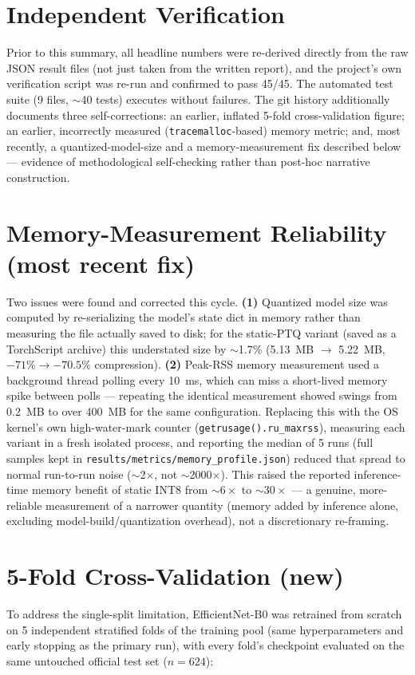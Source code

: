 \documentclass[11pt]{article}
\begin{document}
\section*{Independent Verification}
Prior to this summary, all headline numbers were re-derived directly from
the raw JSON result files (not just taken from the written report), and the
project's own verification script was re-run and confirmed to pass 45/45.
The automated test suite (9 files, $\sim$40 tests) executes without
failures. The git history additionally documents three self-corrections: an
earlier, inflated 5-fold cross-validation figure; an earlier, incorrectly
measured (\texttt{tracemalloc}-based) memory metric; and, most recently, a
quantized-model-size and a memory-measurement fix described below ---
evidence of methodological self-checking rather than post-hoc narrative
construction.

\section*{Memory-Measurement Reliability (most recent fix)}
Two issues were found and corrected this cycle. \textbf{(1)} Quantized model
size was computed by re-serializing the model's state dict in memory rather
than measuring the file actually saved to disk; for the static-PTQ variant
(saved as a TorchScript archive) this understated size by $\sim$1.7\%
(5.13~MB $\to$ 5.22~MB, $-71\% \to -70.5\%$ compression). \textbf{(2)}
Peak-RSS memory measurement used a background thread polling every 10~ms,
which can miss a short-lived memory spike between polls --- repeating the
identical measurement showed swings from 0.2~MB to over 400~MB for the same
configuration. Replacing this with the OS kernel's own high-water-mark
counter (\texttt{getrusage().ru\_maxrss}), measuring each variant in a
fresh isolated process, and reporting the median of 5 runs (full samples
kept in \texttt{results/metrics/memory\_profile.json}) reduced that spread
to normal run-to-run noise ($\sim$2$\times$, not $\sim$2000$\times$). This
raised the reported inference-time memory benefit of static INT8 from
$\sim6\times$ to $\sim30\times$ --- a genuine, more-reliable measurement of
a narrower quantity (memory added by inference alone, excluding
model-build/quantization overhead), not a discretionary re-framing.

\section*{5-Fold Cross-Validation (new)}
To address the single-split limitation, EfficientNet-B0 was retrained from
scratch on 5 independent stratified folds of the training pool (same
hyperparameters and early stopping as the primary run), with every fold's
checkpoint evaluated on the same untouched official test set ($n=624$):
\end{document}
